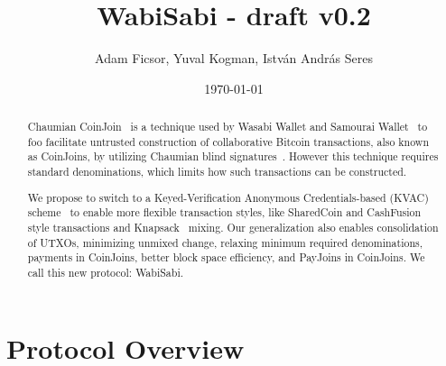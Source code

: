 \documentclass{article}
\title{WabiSabi - draft v0.2}
\author{Adam Ficsor, Yuval Kogman, István András Seres}
\date{\today}
\begin{document}
\maketitle

\begin{abstract}


Chaumian CoinJoin~\cite{mizrahi2013blind}\cite{maxwell2013coinjoin} is a technique used by Wasabi Wallet and Samourai Wallet~\cite{zerolink} to foo facilitate untrusted construction of collaborative Bitcoin transactions, also known as CoinJoins, by utilizing Chaumian blind signatures~\cite{chaum1983blind}. However this technique requires standard denominations, which limits how such transactions can be constructed.

We propose to switch to a Keyed-Verification Anonymous Credentials-based (KVAC) scheme~\cite{chase2019signal} to enable more flexible transaction styles, like SharedCoin and CashFusion~\cite{cashfusion} style transactions and Knapsack~\cite{maurer2017anonymous} mixing. Our generalization also enables consolidation of UTXOs, minimizing unmixed change, relaxing minimum required denominations, payments in CoinJoins, better block space efficiency, and PayJoins in CoinJoins. We call this new protocol: WabiSabi.

\end{abstract}




\section{Protocol Overview}
\end{document}
